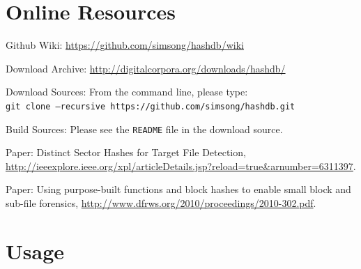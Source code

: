 \documentclass[11pt,twoside]{article}
\newcommand \bulk {\textit{bulk\_extractor}\xspace}
\newcommand \hdb {\textit{hashdb}\xspace}
\newcommand \hdbc {\textit{hashdb\_checker}\xspace}
\newcommand \hid {\textit{hashid}\xspace}
\begin{document}
\section{Online Resources}
\begin{compactitem}	
\item Github Wiki: \url{https://github.com/simsong/hashdb/wiki}
\item Download Archive: \url{http://digitalcorpora.org/downloads/hashdb/}
\item Download Sources: From the command line, please type: \\
\texttt{git clone --recursive https://github.com/simsong/hashdb.git}
\item Build Sources: Please see the \texttt{README} file in the download source.
\item Paper: Distinct Sector Hashes for Target File Detection,
\url{http://ieeexplore.ieee.org/xpl/articleDetails.jsp?reload=true&arnumber=6311397}.
\item Paper: Using purpose-built functions and block hashes to enable small block and sub-file forensics,
\url{http://www.dfrws.org/2010/proceedings/2010-302.pdf}.
\end{compactitem}	



\appendix
\section{Usage}
\end{document}
